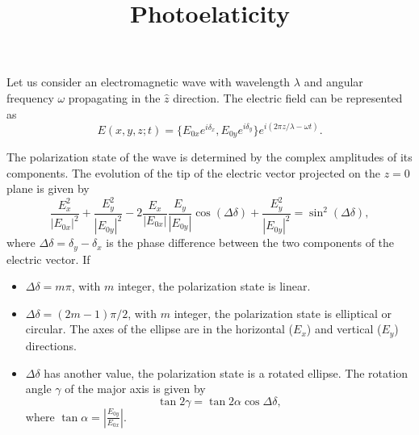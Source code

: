 \documentclass{article}
\title{Photoelaticity}
\begin{document}
\maketitle

\noindent Let us consider an electromagnetic wave with wavelength $\lambda$ and angular frequency $\omega$ propagating in the $\hat{z}$ direction. The electric field can be represented as
\begin{equation}
E(x,y,z;t) = \{E_{0x}e^{i\delta_x}, E_{0y}e^{i\delta_y}\}e^{i(2\pi z/\lambda - \omega t)}.
\end{equation}

\noindent The polarization state of the wave is determined by the complex amplitudes of its components. The evolution of the tip of the electric vector projected on the $z=0$ plane is given by
\begin{equation}
\frac{E_x^2}{|E_{0x}|^2} + \frac{E_y^2}{|E_{0y}|^2} - 2\frac{E_x}{|E_{0x}|}\frac{E_y}{|E_{0y}|}\cos(\Delta \delta) + \frac{E_y^2}{|E_{0y}|^2} = \sin^2(\Delta \delta),
\end{equation}
where $\Delta \delta = \delta_y - \delta_x$ is the phase difference between the two components of the electric vector. If

\begin{itemize}
    \item $\Delta \delta = m\pi$, with $m$ integer, the polarization state is linear.
    \item $\Delta \delta = (2m-1)\pi/2$, with $m$ integer, the polarization state is elliptical or circular. The axes of the ellipse are in the horizontal ($E_x$) and vertical ($E_y$) directions.
    \item $\Delta \delta$ has another value, the polarization state is a rotated ellipse. The rotation angle $\gamma$ of the major axis is given by
    \begin{equation}
    \tan 2\gamma = \tan 2\alpha \cos \Delta \delta,
    \end{equation}
    where $\tan \alpha = \left|\frac{E_{0y}}{E_{0x}}\right|$.
\end{itemize}
\end{document}
